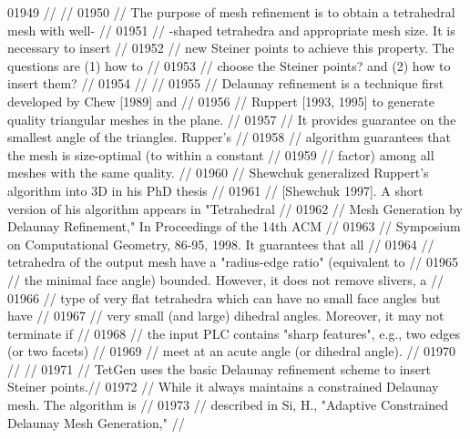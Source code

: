 \begin{DoxyCode}
01949 \textcolor{comment}{//                                                                           //}
01950 \textcolor{comment}{// The purpose of mesh refinement is to obtain a tetrahedral mesh with well- //}
01951 \textcolor{comment}{// -shaped tetrahedra and appropriate mesh size.  It is necessary to insert  //}
01952 \textcolor{comment}{// new Steiner points to achieve this property. The questions are (1) how to //}
01953 \textcolor{comment}{// choose the Steiner points? and (2) how to insert them?                    //}
01954 \textcolor{comment}{//                                                                           //}
01955 \textcolor{comment}{// Delaunay refinement is a technique first developed by Chew [1989] and     //}
01956 \textcolor{comment}{// Ruppert [1993, 1995] to generate quality triangular meshes in the plane.  //}
01957 \textcolor{comment}{// It provides guarantee on the smallest angle of the triangles.  Rupper's   //}
01958 \textcolor{comment}{// algorithm guarantees that the mesh is size-optimal (to within a constant  //}
01959 \textcolor{comment}{// factor) among all meshes with the same quality.                           //}
01960 \textcolor{comment}{//   Shewchuk generalized Ruppert's algorithm into 3D in his PhD thesis      //}
01961 \textcolor{comment}{// [Shewchuk 1997]. A short version of his algorithm appears in "Tetrahedral //}
01962 \textcolor{comment}{// Mesh Generation by Delaunay Refinement," In Proceedings of the 14th ACM   //}
01963 \textcolor{comment}{// Symposium on Computational Geometry, 86-95, 1998.  It guarantees that all //}
01964 \textcolor{comment}{// tetrahedra of the output mesh have a "radius-edge ratio" (equivalent to   //}
01965 \textcolor{comment}{// the minimal face angle) bounded. However, it does not remove slivers, a   //}
01966 \textcolor{comment}{// type of very flat tetrahedra which can have no small face angles but have //}
01967 \textcolor{comment}{// very small (and large) dihedral angles. Moreover, it may not terminate if //}
01968 \textcolor{comment}{// the input PLC contains "sharp features", e.g., two edges (or two facets)  //}
01969 \textcolor{comment}{// meet at an acute angle (or dihedral angle).                               //}
01970 \textcolor{comment}{//                                                                           //}
01971 \textcolor{comment}{// TetGen uses the basic Delaunay refinement scheme to insert Steiner points.//}
01972 \textcolor{comment}{// While it always maintains a constrained Delaunay mesh.  The algorithm is  //}
01973 \textcolor{comment}{// described in Si, H., "Adaptive Constrained Delaunay Mesh Generation,"     //}

\end{DoxyCode}
